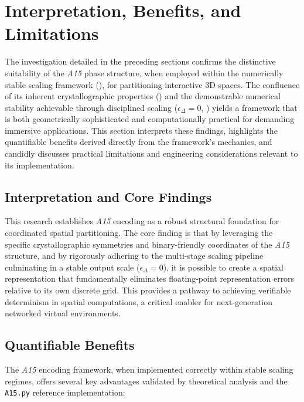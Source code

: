 \documentclass[10pt]{article}
\def\AAAB{\textit{A15}}
\begin{document}
\section{Interpretation, Benefits, and Limitations}\label{sec:discussion}

The investigation detailed in the preceding sections confirms the distinctive suitability of the \AAAB{} phase structure, when employed within the numerically stable scaling framework (), for partitioning interactive 3D spaces. The confluence of its inherent crystallographic properties () and the demonstrable numerical stability achievable through disciplined scaling ($\epsilon_\Delta = 0$, ) yields a framework that is both geometrically sophisticated and computationally practical for demanding immersive applications. This section interprets these findings, highlights the quantifiable benefits derived directly from the framework's mechanics, and candidly discusses practical limitations and engineering considerations relevant to its implementation.

\subsection{Interpretation and Core Findings}\label{subsec:discussion-interpretation}

This research establishes \AAAB{} encoding as a robust structural foundation for coordinated spatial partitioning. The core finding is that by leveraging the specific crystallographic symmetries and binary-friendly coordinates of the \AAAB{} structure, and by rigorously adhering to the multi-stage scaling pipeline culminating in a stable output scale ($\epsilon_\Delta = 0$), it is possible to create a spatial representation that fundamentally eliminates floating-point representation errors relative to its own discrete grid. This provides a pathway to achieving verifiable determinism in spatial computations, a critical enabler for next-generation networked virtual environments.

\subsection{Quantifiable Benefits}\label{subsec:discussion-benefits}

The \AAAB{} encoding framework, when implemented correctly within stable scaling regimes, offers several key advantages validated by theoretical analysis and the \texttt{A15.py} \cite{Risinger2024A15} reference implementation:
\end{document}
